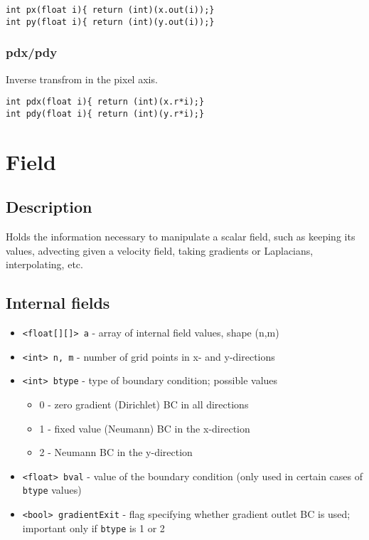 \documentclass[notitlepage]{article}
\begin{document}
\begin{lstlisting}[style=myCpp]
int px(float i){ return (int)(x.out(i));}
int py(float i){ return (int)(y.out(i));}
\end{lstlisting}

\subsubsection{pdx/pdy}

Inverse transfrom in the pixel axis.

\begin{lstlisting}[style=myCpp]
int pdx(float i){ return (int)(x.r*i);}
int pdy(float i){ return (int)(y.r*i);}
\end{lstlisting}

\section{Field}

\subsection{Description}

Holds the information necessary to manipulate a scalar field,
such as keeping its values, advecting given a velocity field,
taking gradients or Laplacians, interpolating, etc.

\subsection{Internal fields}

\begin{itemize}
\item \texttt{<float[][]> a} - array of internal field values, shape (n,m)
\item \texttt{<int> n, m} - number of grid points in x- and y-directions
\item \texttt{<int> btype} - type of boundary condition; possible values
	\begin{itemize}
	\item 0 - zero gradient (Dirichlet) BC in all directions
	\item 1 - fixed value (Neumann) BC in the x-direction
	\item 2 - Neumann BC in the y-direction
	\end{itemize}
\item \texttt{<float> bval} - value of the boundary condition (only used in certain cases of \texttt{btype} values)
\item \texttt{<bool> gradientExit} - flag specifying whether gradient outlet BC is used;
	important only if \texttt{btype} is 1 or 2
\end{itemize}
\end{document}
